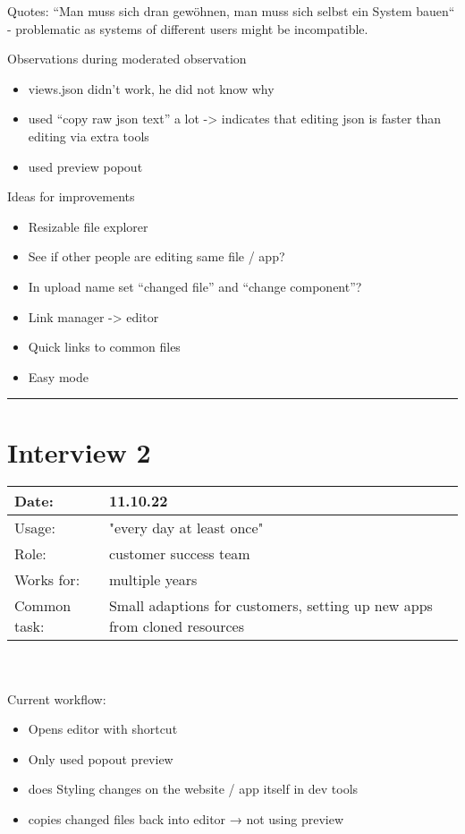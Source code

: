 Quotes:
“Man muss sich dran gewöhnen, man muss sich selbst ein System bauen“ - problematic as systems of different users might be incompatible.

Observations during moderated observation
\begin{itemize}[nosep]
  \item views.json didn't work, he did not know why
  \item used “copy raw json text” a lot -> indicates that editing json is faster than editing via extra tools
  \item used preview popout
\end{itemize}

Ideas for improvements
\begin{itemize}[nosep]
  \item Resizable file explorer
  \item See if other people are editing same file / app?
  \item In upload name set “changed file” and “change component”?
  \item Link manager -> editor
  \item Quick links to common files
  \item Easy mode
\end{itemize}
\bigskip
\hrule
\section{Interview 2}
\begin{tabularx}{\linewidth}{lX}
  Date: & 11.10.22 \\
  \hline
  Usage: & "every day at least once"\\
  \hline
  Role: & customer success team \\
  \hline
  Works for: & multiple years \\
  \hline
  Common task: &  Small adaptions for customers, setting up new apps from cloned resources
\end{tabularx}
\\\\


Current workflow:
\begin{itemize}[nosep]
  \item Opens editor with shortcut
  \item Only used popout preview
  \item does Styling changes on the website / app itself in dev tools
  \item copies changed files back into editor → not using preview
\end{itemize}

